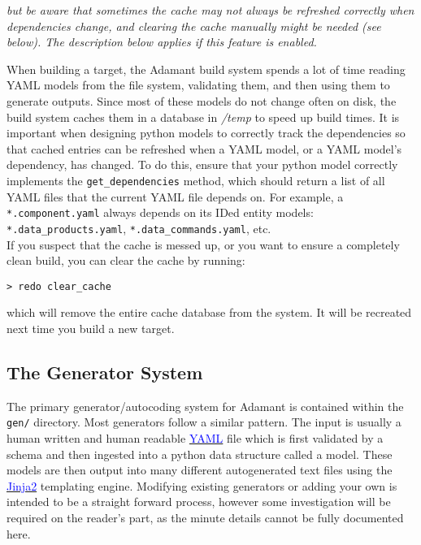 \textit{but be aware that sometimes the cache may not always be refreshed correctly when dependencies change, and clearing the cache manually might be needed (see below). The description below applies if this feature is enabled.}
\vspace{5mm} %

When building a target, the Adamant build system spends a lot of time reading YAML models from the file system, validating them, and then using them to generate outputs. Since most of these models do not change often on disk, the build system caches them in a database in \textit{/temp} to speed up build times. It is important when designing python models to correctly track the dependencies so that cached entries can be refreshed when a YAML model, or a YAML model's dependency, has changed. To do this, ensure that your python model correctly implements the \texttt{get\_dependencies} method, which should return a list of all YAML files that the current YAML file depends on. For example, a \texttt{*.component.yaml} always depends on its IDed entity models: \texttt{*.data\_products.yaml}, \texttt{*.data\_commands.yaml}, etc. \\

If you suspect that the cache is messed up, or you want to ensure a completely clean build, you can clear the cache by running:

\vspace{5mm} %
\begin{verbatim}
> redo clear_cache
\end{verbatim}
\vspace{5mm} %

which will remove the entire cache database from the system. It will be recreated next time you build a new target.

\subsection{The Generator System} \label{Adding Generators}

The primary generator/autocoding system for Adamant is contained within the \texttt{gen/} directory. Most generators follow a similar pattern. The input is usually a human written and human readable \href{http://yaml.org}{\textcolor{blue}{YAML}} file which is first validated by a schema and then ingested into a python data structure called a model. These models are then output into many different autogenerated text files using the \href{http://jinja.pocoo.org}{\textcolor{blue}{Jinja2}} templating engine. Modifying existing generators or adding your own is intended to be a straight forward process, however some investigation will be required on the reader's part, as the minute details cannot be fully documented here.

